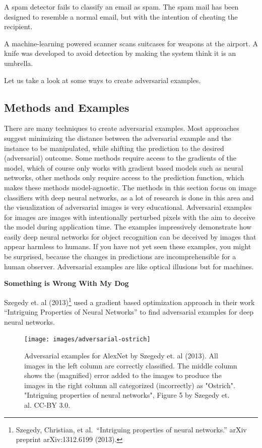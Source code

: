 \documentclass[
  12pt,
]{krantz}
\begin{document}
A spam detector fails to classify an email as spam.
The spam mail has been designed to resemble a normal email, but with the intention of cheating the recipient.

A machine-learning powered scanner scans suitcases for weapons at the airport.
A knife was developed to avoid detection by making the system think it is an umbrella.

Let us take a look at some ways to create adversarial examples.

\hypertarget{methods-and-examples}{%
\subsection{Methods and Examples}\label{methods-and-examples}}

There are many techniques to create adversarial examples.
Most approaches suggest minimizing the distance between the adversarial example and the instance to be manipulated, while shifting the prediction to the desired (adversarial) outcome.
Some methods require access to the gradients of the model, which of course only works with gradient based models such as neural networks, other methods only require access to the prediction function, which makes these methods model-agnostic.
The methods in this section focus on image classifiers with deep neural networks, as a lot of research is done in this area and the visualization of adversarial images is very educational.
Adversarial examples for images are images with intentionally perturbed pixels with the aim to deceive the model during application time.
The examples impressively demonstrate how easily deep neural networks for object recognition can be deceived by images that appear harmless to humans.
If you have not yet seen these examples, you might be surprised, because the changes in predictions are incomprehensible for a human observer.
Adversarial examples are like optical illusions but for machines.

\textbf{Something is Wrong With My Dog}

Szegedy et. al (2013)\footnote{Szegedy, Christian, et al.~``Intriguing properties of neural networks.'' arXiv preprint arXiv:1312.6199 (2013).} used a gradient based optimization approach in their work ``Intriguing Properties of Neural Networks'' to find adversarial examples for deep neural networks.

\begin{figure}

{\centering \texttt{[image: images/adversarial-ostrich]} 

}

\caption{Adversarial examples for AlexNet by Szegedy et. al (2013). All images in the left column are correctly classified. The middle column shows the (magnified) error added to the images to produce the images in the right column all categorized (incorrectly) as "Ostrich". "Intriguing properties of neural networks", Figure 5 by Szegedy et. al. CC-BY 3.0.}\label{fig:adversarial-ostrich}
\end{figure}
\end{document}
